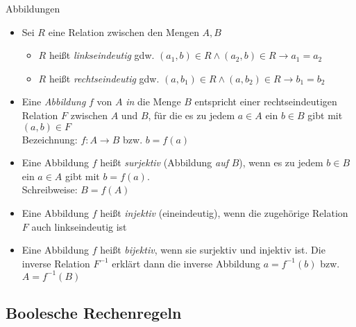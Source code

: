 \begin{frame}{Abbildungen}
	\begin{itemize}
		\item Sei $R$ eine Relation zwischen den Mengen $A,B$
		\begin{itemize}
			\item $R$ heißt \emph{linkseindeutig} gdw. $(a_1,b)\in R\land (a_2,b)\in R \rightarrow a_1=a_2$
			\item $R$ heißt \emph{rechtseindeutig} gdw. $(a,b_1)\in R\land (a,b_2)\in R \rightarrow b_1=b_2$
		\end{itemize}
		\item Eine \emph{Abbildung} $f$ von $A$ \emph{in} die Menge $B$ entspricht einer rechtseindeutigen Relation $F$ zwischen $A$ und $B$, für die es zu jedem $a\in A$ ein $b\in B$ gibt mit $(a,b) \in F$\\
		Bezeichnung: $f: A \rightarrow B$ bzw. $b=f(a)$
		\item Eine Abbildung $f$ heißt \emph{surjektiv} (Abbildung \emph{auf} $B$), wenn es zu jedem $b\in B$ ein $a\in A$ gibt mit $b=f(a)$.\\
		Schreibweise: $B = f(A)$
		\item Eine Abbildung $f$ heißt \emph{injektiv} (eineindeutig), wenn die zugehörige Relation $F$ auch linkseindeutig ist
		\item Eine Abbildung $f$ heißt \emph{bijektiv}, wenn sie surjektiv und injektiv ist. Die inverse Relation $F^{-1}$ erklärt dann die inverse Abbildung $a = f^{-1}(b)$ bzw. $A=f^{-1}(B)$
	\end{itemize}
\end{frame}

\subsection{Boolesche Rechenregeln}

